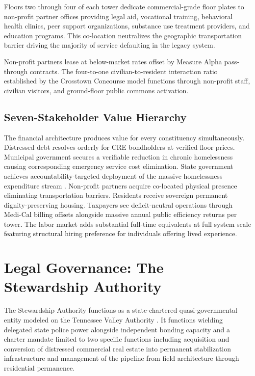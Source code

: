 \documentclass[12pt, letterpaper]{article}
\begin{document}
Floors two through four of each tower dedicate commercial-grade floor plates to non-profit partner offices providing legal aid, vocational training, behavioral health clinics, peer support organizations, substance use treatment providers, and education programs. This co-location neutralizes the geographic transportation barrier driving the majority of service defaulting in the legacy system.

Non-profit partners lease at below-market rates offset by Measure Alpha pass-through contracts. The four-to-one civilian-to-resident interaction ratio established by the Crosstown Concourse model \citep{crosstown_concourse_2017} functions through non-profit staff, civilian visitors, and ground-floor public commons activation.

\subsection{Seven-Stakeholder Value Hierarchy}

The financial architecture produces value for every constituency simultaneously. Distressed debt resolves orderly for CRE bondholders at verified floor prices. Municipal government secures a verifiable reduction in chronic homelessness causing corresponding emergency service cost elimination. State government achieves accountability-targeted deployment of the massive homelessness expenditure stream \citep{ca_24b_expenditure_2026}. Non-profit partners acquire co-located physical presence eliminating transportation barriers. Residents receive sovereign permanent dignity-preserving housing. Taxpayers see deficit-neutral operations through Medi-Cal billing offsets alongside massive annual public efficiency returns per tower. The labor market adds substantial full-time equivalents at full system scale featuring structural hiring preference for individuals offering lived experience.

\section{Legal Governance: The Stewardship Authority}

The Stewardship Authority functions as a state-chartered quasi-governmental entity modeled on the Tennessee Valley Authority \citep{tva_act_1933}. It functions wielding delegated state police power alongside independent bonding capacity and a charter mandate limited to two specific functions including acquisition and conversion of distressed commercial real estate into permanent stabilization infrastructure and management of the pipeline from field architecture through residential permanence.
\end{document}
